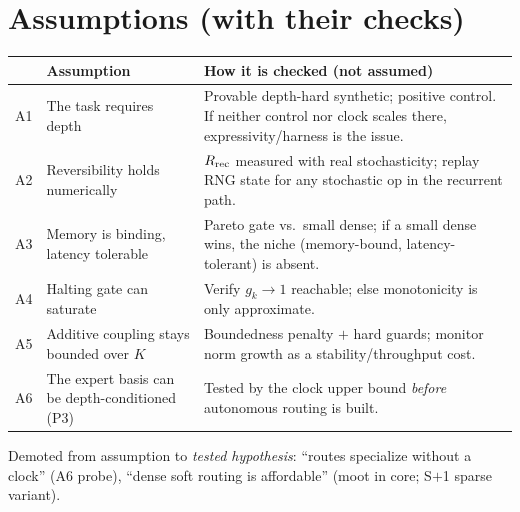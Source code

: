 \documentclass[11pt]{article}
\begin{document}
\section{Assumptions (with their checks)}
\renewcommand{\arraystretch}{1.2}
\begin{center}\footnotesize
\begin{tabularx}{\textwidth}{@{}c L{0.42\textwidth} L{0.40\textwidth}@{}}
\toprule
& \textbf{Assumption} & \textbf{How it is checked (not assumed)} \\
\midrule
A1 & The task requires depth & Provable depth-hard synthetic; positive control. If neither control nor clock scales there, expressivity/harness is the issue. \\
A2 & Reversibility holds numerically & $R_{\rm rec}$ measured with real stochasticity; replay RNG state for any stochastic op in the recurrent path. \\
A3 & Memory is binding, latency tolerable & Pareto gate vs.\ small dense; if a small dense wins, the niche (memory-bound, latency-tolerant) is absent. \\
A4 & Halting gate can saturate & Verify $g_k\!\to\!1$ reachable; else monotonicity is only approximate. \\
A5 & Additive coupling stays bounded over $K$ & Boundedness penalty $+$ hard guards; monitor norm growth as a stability/throughput cost. \\
A6 & The expert basis can be depth-conditioned (P3) & Tested by the clock upper bound \emph{before} autonomous routing is built. \\
\bottomrule
\end{tabularx}
\end{center}
Demoted from assumption to \emph{tested hypothesis}: ``routes specialize without a clock'' (A6 probe), ``dense soft routing is affordable'' (moot in core; S$+$1 sparse variant).

\end{document}
